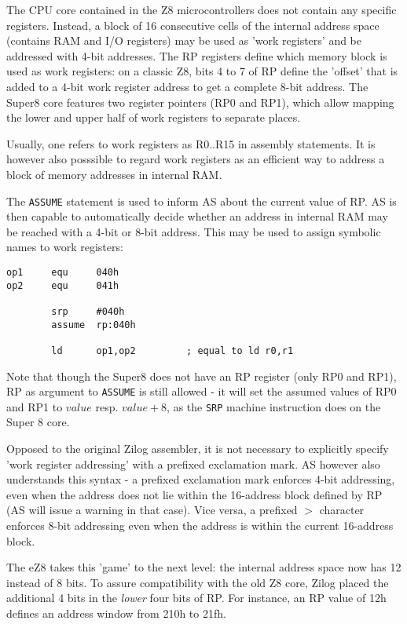 \documentclass[12pt,twoside]{report}
\newcommand{\tty}[1]{{\tt #1}}
\newcommand{\asname}{{AS}}
\begin{document}
The CPU core contained in the Z8 microcontrollers does not
contain any specific registers.  Instead, a block of 16
consecutive cells of the internal address space (contains RAM and
I/O registers) may be used as 'work registers' and be addressed
with 4-bit addresses.  The RP registers define which memory block
is used as work registers: on a classic Z8, bits 4 to 7 of RP
define the 'offset' that is added to a 4-bit work register
address to get a complete 8-bit address.  The Super8 core
features two register pointers (RP0 and RP1), which allow mapping
the lower and upper half of work registers to separate places.

Usually, one refers to work registers as R0..R15 in assembly
statements.  It is however also posssible to regard work registers as
an efficient way to address a block of memory addresses in internal
RAM.

The \tty{ASSUME} statement is used to inform \asname{} about the current
value of RP. \asname{} is then capable to automatically decide whether an
address in internal RAM may be reached with a 4-bit or 8-bit address.
This may be used to assign symbolic names to work registers:
\begin{verbatim}
op1     equ     040h
op2     equ     041h

        srp     #040h
        assume  rp:040h

        ld      op1,op2         ; equal to ld r0,r1
\end{verbatim}
Note that though the Super8 does not have an RP register (only
RP0 and RP1), RP as argument to \tty{ASSUME} is still allowed -
it will set the assumed values of RP0 and RP1 to $value$ resp.
$value+8$, as the \tty{SRP} machine instruction does on the Super
8 core.

Opposed to the original Zilog assembler, it is not necessary to
explicitly specify 'work register addressing' with a prefixed
exclamation mark.  \asname{} however also understands this syntax - a
prefixed exclamation mark enforces 4-bit addressing, even when the
address does not lie within the 16-address block defined by RP (\asname{} will
issue a warning in that case).  Vice versa, a prefixed $>$
character enforces 8-bit addressing even when the address is within
the current 16-address block.

The eZ8 takes this 'game' to the next level: the internal address
space now has 12 instead of 8 bits.  To assure compatibility with the
old Z8 core, Zilog placed the additional 4 bits in the {\em lower}
four bits of RP.  For instance, an RP value of 12h defines an address
window from 210h to 21fh.
\end{document}
